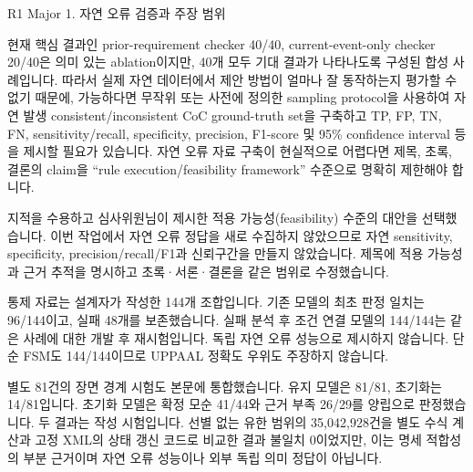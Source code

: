 




\clearpage

\begin{reviewitem}{R1 Major 1. 자연 오류 검증과 주장 범위}

\begin{reviewercomment}

현재 핵심 결과인 prior-requirement checker 40/40, current-event-only checker 20/40은 의미 있는 ablation이지만, 40개 모두 기대 결과가 나타나도록 구성된 합성 사례입니다. 따라서 실제 자연 데이터에서 제안 방법이 얼마나 잘 동작하는지 평가할 수 없기 때문에, 가능하다면 무작위 또는 사전에 정의한 sampling protocol을 사용하여 자연 발생 consistent/inconsistent CoC ground-truth set을 구축하고 TP, FP, TN, FN, sensitivity/recall, specificity, precision, F1-score 및 95\% confidence interval 등을 제시할 필요가 있습니다. 자연 오류 자료 구축이 현실적으로 어렵다면 제목, 초록, 결론의 claim을 ``rule execution/feasibility framework'' 수준으로 명확히 제한해야 합니다.

\end{reviewercomment}

\begin{authorresponse}

지적을 수용하고 심사위원님이 제시한 적용 가능성(feasibility) 수준의 대안을 선택했습니다. 이번 작업에서 자연 오류 정답을 새로 수집하지 않았으므로 자연 sensitivity, specificity, precision/recall/F1과 신뢰구간을 만들지 않았습니다. 제목에 적용 가능성과 근거 추적을 명시하고 초록·서론·결론을 같은 범위로 수정했습니다.

통제 자료는 설계자가 작성한 144개 조합입니다. 기존 모델의 최초 판정 일치는 96/144이고, 실패 48개를 보존했습니다. 실패 분석 후 조건 연결 모델의 144/144는 같은 사례에 대한 개발 후 재시험입니다. 독립 자연 오류 성능으로 제시하지 않습니다. 단순 FSM도 144/144이므로 UPPAAL 정확도 우위도 주장하지 않습니다.

별도 81건의 장면 경계 시험도 본문에 통합했습니다. 유지 모델은 81/81, 초기화는 14/81입니다. 초기화 모델은 확정 모순 41/44와 근거 부족 26/29를 양립으로 판정했습니다. 두 결과는 작성 시험입니다. 선별 없는 유한 범위의 35,042,928건을 별도 수식 계산과 고정 XML의 상태 갱신 코드로 비교한 결과 불일치 0이었지만, 이는 명세 적합성의 부분 근거이며 자연 오류 성능이나 외부 독립 의미 정답이 아닙니다.


\end{authorresponse}
\end{reviewitem}
